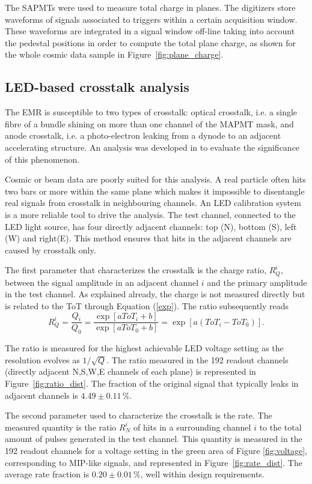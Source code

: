 \documentclass[a4paper,11pt]{article}
\begin{document}
The SAPMTs were used to measure total charge in planes. The digitizers store waveforms of signals associated to triggers within a certain acquisition
window. These waveforms are integrated in a signal window off-line taking into account the pedestal positions in order to compute the total plane
charge, as shown for the whole cosmic data sample in Figure~\ref{fig:plane_charge}.

\subsection{LED-based crosstalk analysis}\label{sec_xt}
The EMR is susceptible to two types of crosstalk: optical crosstalk, i.e. a single fibre of a bundle shining on more than one channel of the MAPMT mask, and anode
crosstalk, i.e. a photo-electron leaking from a dynode to an adjacent accelerating structure. An analysis was developed in \cite{emr_xt, Francois} to evaluate the
significance of this phenomenon.

Cosmic or beam data are poorly suited for this analysis. A real particle often hits two bars or more within the same plane which makes it impossible to disentangle
real signals from crosstalk in neighbouring channels. An LED calibration system is a more reliable tool to drive the analysis. The test channel, connected to the LED
light source, has four directly adjacent channels: top (N), bottom (S), left (W) and right(E). This method ensures that hits in the adjacent channels are caused
by crosstalk only.

The first parameter that characterizes the crosstalk is the charge ratio, $R_Q^i$, between the signal amplitude in an adjacent channel $i$ and the primary
amplitude in the test channel. As explained already, the charge is not measured directly but is related to the ToT through Equation (\ref{exp}). The ratio
subsequently reads
\begin{equation}
R_Q^i=\frac{Q_i}{Q_0}=\frac{\exp[aToT_i+b]}{\exp[aToT_0+b]}=\exp\left[a(ToT_i-ToT_0)\right].
\end{equation}

The ratio is measured for the highest achievable LED voltage setting as the resolution evolves as $1/\sqrt{Q}$. The ratio measured in the 192 readout channels
(directly adjacent N,S,W,E channels of each plane) is represented in Figure~\ref{fig:ratio_dist}. The fraction of the original signal that typically leaks in
adjacent channels is $4.49\pm0.11\,\%$.

The second parameter used to characterize the crosstalk is the rate. The measured quantity is the ratio $R_N^i$ of hits in a surrounding channel $i$ to the
total amount of pulses generated in the test channel. This quantity is measured in the 192 readout channels for a voltage setting in the green area of Figure
\ref{fig:voltage}, corresponding to MIP-like signals, and represented in Figure~\ref{fig:rate_dist}. The average rate fraction is $0.20\pm0.01\,\%$, well within
design requirements.
\end{document}
